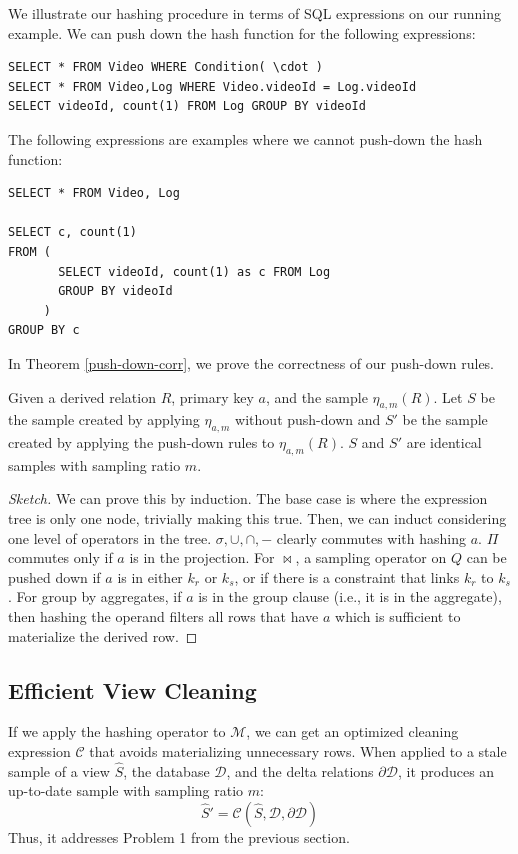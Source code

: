 \begin{example}
We illustrate our hashing procedure in terms of SQL expressions on our running example.
We can push down the hash function for the following expressions:
\begin{lstlisting}
SELECT * FROM Video WHERE Condition( \cdot )
SELECT * FROM Video,Log WHERE Video.videoId = Log.videoId
SELECT videoId, count(1) FROM Log GROUP BY videoId
\end{lstlisting}
\vspace{0.3em}
The following expressions are examples where we cannot push-down the hash function:
\begin{lstlisting}
SELECT * FROM Video, Log

SELECT c, count(1)
FROM ( 
       SELECT videoId, count(1) as c FROM Log 
       GROUP BY videoId
     )
GROUP BY c
\end{lstlisting}

\end{example}

In Theorem \ref{push-down-corr}, we prove the correctness of our push-down rules.

\begin{theorem}\label{push-down-corr}
Given a derived relation $R$, primary key $a$, and the sample $\eta_{a, m}(R)$.
Let $S$ be the sample created by applying $\eta_{a, m}$ without push-down and 
$S'$ be the sample created by applying the push-down rules to $\eta_{a, m}(R)$.
$S$ and $S'$ are identical samples with sampling ratio $m$.
\end{theorem}
\begin{proof}[Sketch]
We can prove this by induction.
The base case is where the expression tree is only one node, trivially making this true.
Then, we can induct considering one level of operators in the tree.
$\sigma, \cup, \cap, -$ clearly commutes with hashing $a$.
$\Pi$ commutes only if $a$ is in the projection.
For $\bowtie$, a sampling operator on $Q$ can be pushed down if $a$ is in either $k_r$ or $k_s$, or if there is a constraint that links $k_r$ to $k_s$.
For group by aggregates, if $a$ is in the group clause (i.e., it is in the aggregate), then hashing the operand filters all rows that have $a$ which is sufficient to materialize the derived row.
\end{proof}

\subsection{Efficient View Cleaning}
If we apply the hashing operator to $\mathcal{M}$, we can get an optimized cleaning expression $\mathcal{C}$ that avoids materializing unnecessary rows. 
When applied to a stale sample of a view $\widehat{S}$, the database $\mathcal{D}$, and the delta relations $\partial \mathcal{D}$, it produces an up-to-date sample with sampling ratio $m$:
\[
\widehat{S}' = \mathcal{C}(\widehat{S},\mathcal{D},\partial \mathcal{D})
\]
Thus, it addresses Problem 1 from the previous section.

